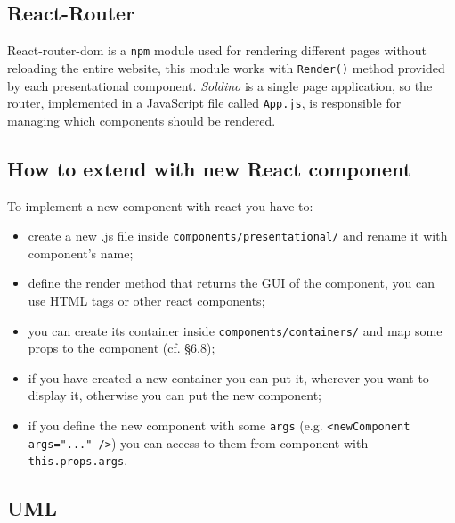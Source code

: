 \subsection{React-Router} 
React-router-dom is a \texttt{npm} module used for rendering different pages without reloading the entire website, this module works with \texttt{Render()} method provided by each presentational component. \textit{Soldino} is a single page application, so the router, implemented in a JavaScript file called \texttt{App.js}, is responsible for managing which components should be rendered.
\subsection{How to extend with new React component}
To implement a new component with react you have to:
\begin{itemize}
	\item create a new .js file inside \texttt{components/presentational/} and rename it with component's name;
	\item define the render method that returns the GUI of the component, you can use HTML tags or other react components;
	\item you can create its container inside \texttt{components/containers/} and map some props to the component (cf. §6.8);
	\item if you have created a new container you can put it, wherever you want to display it, otherwise you can put the new component;
	\item if you define the new component with some \texttt{args} (e.g. \texttt{<newComponent args="..." />}) you can access to them from component with \texttt{this.props.args}.
\end{itemize}

\subsection{UML} 
